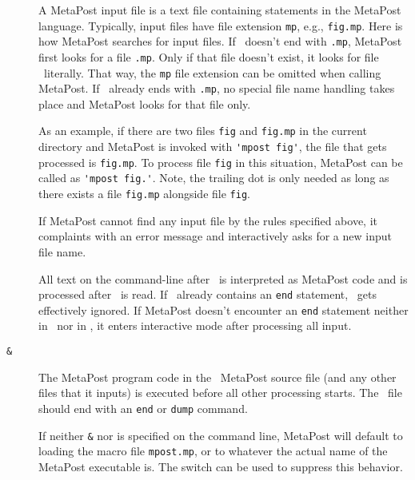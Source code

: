 \begin{description}
\item[\cmdin] A MetaPost input file is a text file containing statements
  in the MetaPost language.  Typically, input files have file extension
  \texttt{mp},
  e.g., \texttt{fig.mp}.  Here is how MetaPost searches for input files.
  If \cmdin\ doesn't end with \texttt{.mp}, MetaPost first looks for a file
  \texttt{\cmdin.mp}.  Only if that file doesn't exist, it looks for
  file \cmdin\ literally.  That way, the \texttt{mp} file extension can be omitted
  when calling MetaPost.  If \cmdin\ already ends with
  \texttt{.mp}, no
  special file name handling takes place and MetaPost looks for that
  file only.

  As an example, if there are two files \texttt{fig} and \texttt{fig.mp}
  in the current directory and MetaPost is invoked with
  \verb|'mpost fig'|, the file that gets processed is \texttt{fig.mp}.
  To process file \texttt{fig} in this situation, MetaPost can be called
  as \verb|'mpost fig.'|.  Note, the trailing dot is only needed as long
  as there exists a file \texttt{fig.mp} alongside file \texttt{fig}.

  If MetaPost cannot find any input file by the rules specified above,
  it complaints with an error message and interactively asks for a new
  input file name.

\item[\cmdcode] All text on the command-line after \cmdin\ is
  interpreted as MetaPost code and is processed after \cmdin\ is read.
  If \cmdin\ already contains an \verb|end| statement, \cmdcode\ gets
  effectively ignored.  If MetaPost doesn't encounter an \verb|end|
  statement neither in \cmdin\ nor in \cmdcode, it enters interactive
  mode after processing all input.

\item[\texttt{\&\cmdmem}] The MetaPost program code in the \cmdmem\
  MetaPost source file (and any other files that it inputs) is executed
  before all other processing starts. The \cmdmem\ file should end with
  an \texttt{end}\index{end?\texttt{end}} or
  \texttt{dump} command.

  If neither \texttt{\&\cmdmem} nor  is specified on the
  command line, MetaPost will default to loading the macro file
  \texttt{mpost.mp}, or to whatever
  the actual name of the MetaPost executable is. The \cmdindex{-ini}
  switch can be used to suppress this behavior.


\end{description}
